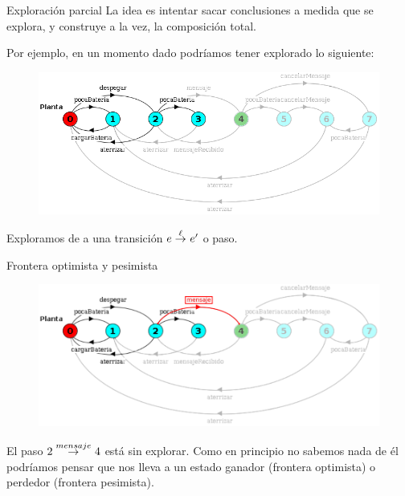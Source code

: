 

\begin{frame}{Exploración parcial}
    La idea es intentar sacar conclusiones a medida que se explora, y construye a la vez, la composición total.
    
    Por ejemplo, en un momento dado podríamos tener explorado lo siguiente:
    \vspace{-10pt}
    \begin{figure}
     \includegraphics[width=\textwidth]{figures/partial.png}
    \end{figure}
    
    \vspace{-10pt}
    Exploramos de a una transición $e \overset{\ell}{\rightarrow}_{} e'$ o paso.
\end{frame}
\begin{frame}{Frontera optimista y pesimista}
    \begin{figure}
     \includegraphics[width=\textwidth]{figures/frontera.png}
    \end{figure}
    El paso $2 \overset{mensaje}{\rightarrow}_{} 4$ está sin explorar. Como en principio no sabemos nada de él podríamos pensar que nos lleva a un estado ganador (frontera optimista) o perdedor (frontera pesimista).
\end{frame}

